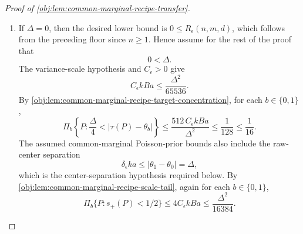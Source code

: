 \documentclass[11pt]{article}
\begin{document}
\begin{proof}[Proof of \cref{obj:lem:common-marginal-recipe-transfer}]
\begin{enumerate}
\item If \(\Delta=0\), then the desired lower bound is \(0\le R_\epsilon(n,m,d)\), which follows from the preceding floor since \(n\ge1\).  Hence assume for the rest of the proof that
\[
0<\Delta.
\]
The variance-scale hypothesis and \(C_\epsilon>0\) give
\[
C_\epsilon kBa\le \frac{\Delta^2}{65536}.
\]
By \cref{obj:lem:common-marginal-recipe-target-concentration}, for each \(b\in\{0,1\}\),
\[
\Pi_b\!\left\{P:\frac{\Delta}{4}<|\tau(P)-\theta_b|\right\}
\le
\frac{512\,C_\epsilon kBa}{\Delta^2}
\le
\frac1{128}
\le
\frac1{16}.
\]
The assumed common-marginal Poisson-prior bounds also include the raw-center separation
\[
\delta_\epsilon k a\le |\theta_1-\theta_0|=\Delta,
\]
which is the center-separation hypothesis required below.
By \cref{obj:lem:common-marginal-recipe-scale-tail}, again for each \(b\in\{0,1\}\),
\[
\Pi_b\{P:s_+(P)<1/2\}
\le
4C_\epsilon kBa
\le
\frac{\Delta^2}{16384}.
\] %


\end{enumerate}
\end{proof}
\end{document}
